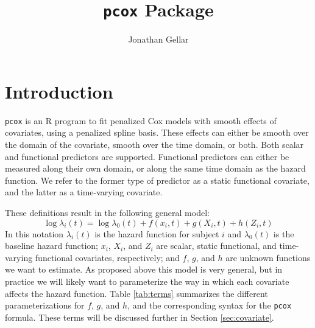 \documentclass[12pt]{article}
\begin{document}
\title{\texttt{pcox} Package}
\author{Jonathan Gellar}
\date{}
\maketitle

\section{Introduction}

\texttt{pcox} is an R program to fit penalized Cox models with smooth effects of covariates, using a penalized
spline basis. These effects can either be smooth over the domain of the covariate, smooth over the time domain,
or both. Both scalar and functional predictors are supported. Functional predictors can either be
measured along their own domain, or along the same time domain as the hazard function. We refer to the former
type of predictor as a static functional covariate, and the latter as a time-varying covariate.

%

These definitions result in the following general model:
\begin{equation} \label{eqn:model}
	\log \lambda_i(t) = \log \lambda_0(t) + f(x_i, t) + g(X_i, t) + h(Z_i, t)
\end{equation}
In this notation $\lambda_i(t)$ is the hazard function for subject $i$ and $\lambda_0(t)$ is the baseline hazard function;
$x_i$, $X_i$, and $Z_i$ are scalar, static functional, and time-varying functional covariates, respectively; and
$f$, $g$, and $h$ are unknown functions we want to estimate. As proposed above this model is very general, but in practice we
will likely want to parameterize the way in which each covariate affects the hazard function. Table
\ref{tab:terms} summarizes the different parameterizations for $f$, $g$, and $h$, and the corresponding
syntax for the \texttt{pcox} formula. These terms will be discussed further in Section \ref{sec:covariate}.
\end{document}
